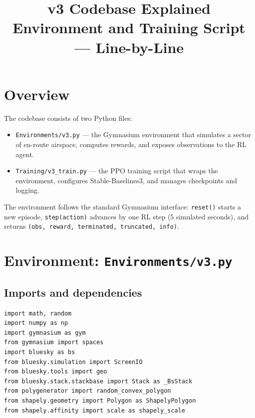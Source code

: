 \documentclass[11pt, a4paper]{article}
\title{\textbf{v3 Codebase Explained}\\[4pt]
       \large Environment and Training Script — Line-by-Line}
\author{}
\date{}
\begin{document}
\maketitle
\tableofcontents
\newpage

\section{Overview}

The codebase consists of two Python files:

\begin{itemize}[noitemsep]
  \item \texttt{Environments/v3.py} --- the Gymnasium environment that simulates
        a sector of en-route airspace, computes rewards, and exposes observations
        to the RL agent.
  \item \texttt{Training/v3\_train.py} --- the PPO training script that wraps
        the environment, configures Stable-Baselines3, and manages checkpoints
        and logging.
\end{itemize}

The environment follows the standard Gymnasium interface: \texttt{reset()} starts
a new episode, \texttt{step(action)} advances by one RL step (5 simulated seconds),
and returns \texttt{(obs, reward, terminated, truncated, info)}.

\section{Environment: \texttt{Environments/v3.py}}

\subsection{Imports and dependencies}

\begin{lstlisting}[caption={Module-level imports.}]
import math, random
import numpy as np
import gymnasium as gym
from gymnasium import spaces
import bluesky as bs
from bluesky.simulation import ScreenIO
from bluesky.tools import geo
from bluesky.stack.stackbase import Stack as _BsStack
from polygenerator import random_convex_polygon
from shapely.geometry import Polygon as ShapelyPolygon
from shapely.affinity import scale as shapely_scale
\end{lstlisting}
\end{document}
